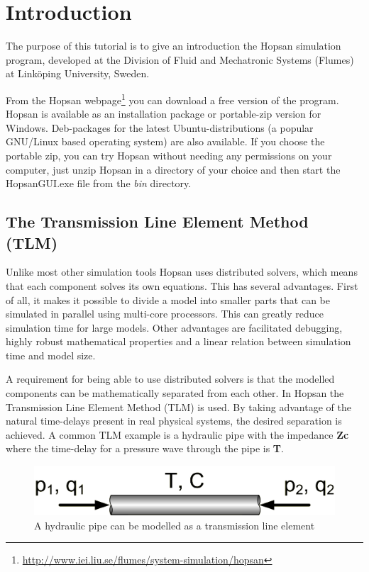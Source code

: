 \documentclass[a4paper,pdftex]{article}
\begin{document}

\section*{Introduction}
The purpose of this tutorial is to give an introduction the Hopsan simulation program, developed at the Division of Fluid and Mechatronic Systems (Flumes) at Linköping University, Sweden.

From the Hopsan webpage\footnote{\url{http://www.iei.liu.se/flumes/system-simulation/hopsan}} you can download a free version of the program.
Hopsan is available as an installation package or portable-zip version for Windows.
Deb-packages for the latest Ubuntu-distributions (a popular GNU/Linux based operating system) are also available.
If you choose the portable zip, you can try Hopsan without needing any permissions on your computer, just unzip Hopsan in a directory of your choice and then start the HopsanGUI.exe file from the \textit{bin} directory.

\subsection*{The Transmission Line Element Method (TLM)}
Unlike most other simulation tools Hopsan uses distributed solvers, which means that each component solves its own equations.
This has several advantages. 
First of all, it makes it possible to divide a model into smaller parts that can be simulated in parallel using multi-core processors. This can greatly reduce simulation time for large models.
Other advantages are facilitated debugging, highly robust mathematical properties and a linear relation between simulation time and model size. 

A requirement for being able to use distributed solvers is that the modelled components can be mathematically separated from each other. 
In Hopsan the Transmission Line Element Method (TLM) is used.
By taking advantage of the natural time-delays present in real physical systems, the desired separation is achieved.
A common TLM example is a hydraulic pipe with the impedance \textbf{Zc} where the time-delay for a pressure wave through the pipe is \textbf{T}.

\begin{figure}[hbt]
  \centering
  \includegraphics[width=0.6\linewidth]{gfx/PosterTransmissionLines.png}
  \caption{A hydraulic pipe can be modelled as a transmission line element}
  \label{fig:hydraulic_pipe}
\end{figure}
\end{document}
